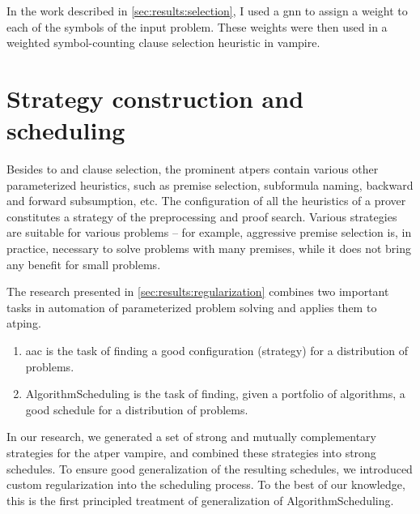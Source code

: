 In the work described in \cref{sec:results:selection},
I used a \gls{gnn} to assign a weight to each of the symbols of the input problem.
These weights were then used in a weighted symbol-counting clause selection heuristic in \gls{vampire}.

\section{Strategy construction and scheduling}

Besides \gls{to} and clause selection, the prominent \glspl{atper} contain various other parameterized heuristics,
such as premise selection, subformula naming, backward and forward subsumption, etc.
The configuration of all the heuristics of a prover constitutes a strategy of the preprocessing and proof search.
Various strategies are suitable for various problems -- for example, aggressive premise selection is, in practice, necessary to solve problems with many premises, while it does not bring any benefit for small problems.

The research presented in \cref{sec:results:regularization} combines two important tasks in automation of parameterized problem solving and applies them to \gls{atping}.
\begin{enumerate}
\item \Gls{aac} is the task of finding a good configuration (strategy) for a distribution of problems.
\item \Gls{AlgorithmScheduling} is the task of finding, given a portfolio of algorithms, a good schedule for a distribution of problems.
\end{enumerate}
In our research, we generated a set of strong and mutually complementary strategies for the \gls{atper} \gls{vampire},
and combined these strategies into strong schedules.
To ensure good generalization of the resulting schedules, we introduced custom regularization into the scheduling process.
To the best of our knowledge, this is the first principled treatment of generalization of \gls{AlgorithmScheduling}.
